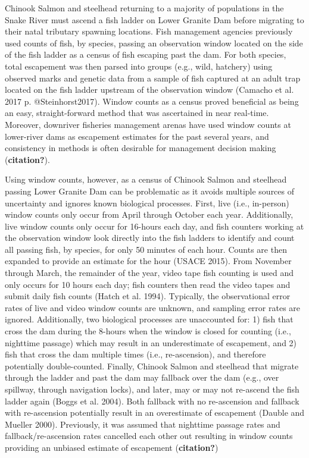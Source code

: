 \documentclass[
  12pt,
]{article}
\begin{document}
Chinook Salmon and steelhead returning to a majority of populations in the Snake River must ascend a fish ladder on Lower Granite Dam before migrating to their natal tributary spawning locations. Fish management agencies previously used counts of fish, by species, passing an observation window located on the side of the fish ladder as a census of fish escaping past the dam. For both species, total escapement was then parsed into groups (e.g., wild, hatchery) using observed marks and genetic data from a sample of fish captured at an adult trap located on the fish ladder upstream of the observation window (Camacho et al. 2017 p. @Steinhorst2017). Window counts as a census proved beneficial as being an easy, straight-forward method that was ascertained in near real-time. Moreover, downriver fisheries management arenas have used window counts at lower-river dams as escapement estimates for the past several years, and consistency in methods is often desirable for management decision making (\textbf{citation?}).

Using window counts, however, as a census of Chinook Salmon and steelhead passing Lower Granite Dam can be problematic as it avoids multiple sources of uncertainty and ignores known biological processes. First, live (i.e., in-person) window counts only occur from April through October each year. Additionally, live window counts only occur for 16-hours each day, and fish counters working at the observation window look directly into the fish ladders to identify and count all passing fish, by species, for only 50 minutes of each hour. Counts are then expanded to provide an estimate for the hour (USACE 2015). From November through March, the remainder of the year, video tape fish counting is used and only occurs for 10 hours each day; fish counters then read the video tapes and submit daily fish counts (Hatch et al. 1994). Typically, the observational error rates of live and video window counts are unknown, and sampling error rates are ignored. Additionally, two biological processes are unaccounted for: 1) fish that cross the dam during the 8-hours when the window is closed for counting (i.e., nighttime passage) which may result in an underestimate of escapement, and 2) fish that cross the dam multiple times (i.e., re-ascension), and therefore potentially double-counted. Finally, Chinook Salmon and steelhead that migrate through the ladder and past the dam may fallback over the dam (e.g., over spillway, through navigation locks), and later, may or may not re-ascend the fish ladder again (Boggs et al. 2004). Both fallback with no re-ascension and fallback with re-ascension potentially result in an overestimate of escapement (Dauble and Mueller 2000). Previously, it was assumed that nighttime passage rates and fallback/re-ascension rates cancelled each other out resulting in window counts providing an unbiased estimate of escapement (\textbf{citation?})
\end{document}
